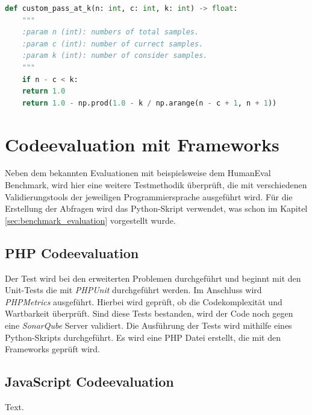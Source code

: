 \begin{lstlisting}[language=Python,label=lst:pass_at_k,caption={Berechnung der pass@k Metrik in Python}]
	def custom_pass_at_k(n: int, c: int, k: int) -> float:
	"""
	:param n (int): numbers of total samples.
	:param c (int): number of currect samples.
	:param k (int): number of consider samples.
	"""
	if n - c < k:
	return 1.0
	return 1.0 - np.prod(1.0 - k / np.arange(n - c + 1, n + 1))
\end{lstlisting}


\section{Codeevaluation mit Frameworks}
Neben dem bekannten Evaluationen mit beispielsweise dem HumanEval Benchmark, wird hier eine weitere Testmethodik überprüft, die mit verschiedenen Validierungstools der jeweiligen Programmiersprache ausgeführt wird. Für die Erstellung der Abfragen wird das Python-Skript verwendet, was schon im Kapitel \ref{sec:benchmark_evaluation} vorgestellt wurde.

\subsection{PHP Codeevaluation}
Der Test wird bei den erweiterten Problemen durchgeführt und beginnt mit den Unit-Tests die mit \textit{PHPUnit} durchgeführt werden. Im Anschluss wird \textit{PHPMetrics} ausgeführt. Hierbei wird geprüft, ob die Codekomplexität und Wartbarkeit überprüft. Sind diese Tests bestanden, wird der Code noch gegen eine \textit{SonarQube} Server validiert. Die Ausführung der Tests wird mithilfe eines Python-Skripts durchgeführt. Es wird eine PHP Datei erstellt, die mit den Frameworks geprüft wird.

\subsection{JavaScript Codeevaluation}
Text.

